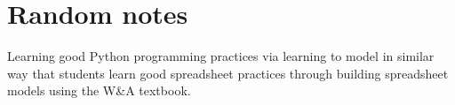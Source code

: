 \documentclass[ited,blindrev]{informs3}              %
\begin{document}
\section{Random notes}
Learning good Python programming practices via learning to model in similar way that students learn good spreadsheet practices through building spreadsheet models using the W\&A textbook.






\ACKNOWLEDGMENT{%
}%


%
%
%




\end{document}
